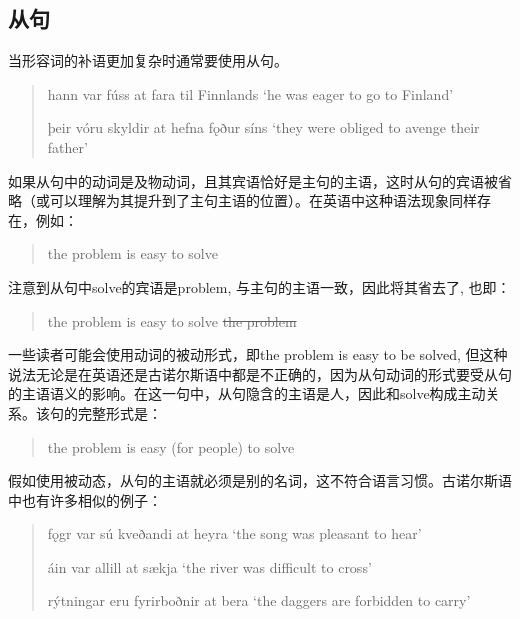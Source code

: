 \subsection{从句}
当形容词的补语更加复杂时通常要使用从句。
\begin{quote}
    hann var fúss at fara til Finnlands `he was eager to go to Finland'

    þeir vóru skyldir at hefna fǫður síns `they were obliged to avenge their father'
\end{quote}
如果从句中的动词是及物动词，且其宾语恰好是主句的主语，这时从句的宾语被省略（或可以理解为其提升到了主句主语的位置）。在英语中这种语法现象同样存在，例如：
\begin{quote}
    the problem is easy to solve
\end{quote}
注意到从句中solve的宾语是problem, 与主句的主语一致，因此将其省去了, 也即：
\begin{quote}
    the problem is easy to solve \sout{the problem}
\end{quote}
一些读者可能会使用动词的被动形式，即\dagger the problem is easy to be solved, 但这种说法无论是在英语还是古诺尔斯语中都是不正确的，因为从句动词的形式要受从句的主语语义的影响。在这一句中，从句隐含的主语是人，因此和solve构成主动关系。该句的完整形式是：
\begin{quote}
    the problem is easy (for people) to solve
\end{quote}
假如使用被动态，从句的主语就必须是别的名词，这不符合语言习惯。古诺尔斯语中也有许多相似的例子：
\begin{quote}
    fǫgr var sú kveðandi at heyra `the song was pleasant to hear'

    áin var allill at sækja `the river was difficult to cross'

    rýtningar eru fyrirboðnir at bera `the daggers are forbidden to carry'
\end{quote}
